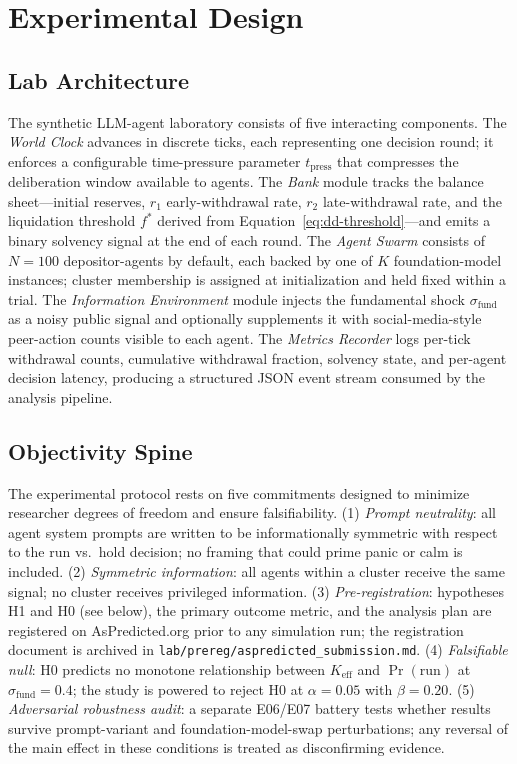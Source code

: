 \section{Experimental Design}
\label{sec:design}

\subsection{Lab Architecture}

The synthetic LLM-agent laboratory consists of five interacting components. The \emph{World Clock} advances in discrete ticks, each representing one decision round; it enforces a configurable time-pressure parameter $t_{\text{press}}$ that compresses the deliberation window available to agents. The \emph{Bank} module tracks the balance sheet---initial reserves, $r_1$ early-withdrawal rate, $r_2$ late-withdrawal rate, and the liquidation threshold $f^*$ derived from Equation~\eqref{eq:dd-threshold}---and emits a binary solvency signal at the end of each round. The \emph{Agent Swarm} consists of $N = 100$ depositor-agents by default, each backed by one of $K$ foundation-model instances; cluster membership is assigned at initialization and held fixed within a trial. The \emph{Information Environment} module injects the fundamental shock $\sigma_{\text{fund}}$ as a noisy public signal and optionally supplements it with social-media-style peer-action counts visible to each agent. The \emph{Metrics Recorder} logs per-tick withdrawal counts, cumulative withdrawal fraction, solvency state, and per-agent decision latency, producing a structured JSON event stream consumed by the analysis pipeline.

\subsection{Objectivity Spine}

The experimental protocol rests on five commitments designed to minimize researcher degrees of freedom and ensure falsifiability. (1) \emph{Prompt neutrality}: all agent system prompts are written to be informationally symmetric with respect to the run vs.\ hold decision; no framing that could prime panic or calm is included. (2) \emph{Symmetric information}: all agents within a cluster receive the same signal; no cluster receives privileged information. (3) \emph{Pre-registration}: hypotheses H1 and H0 (see below), the primary outcome metric, and the analysis plan are registered on AsPredicted.org prior to any simulation run; the registration document is archived in \texttt{lab/prereg/aspredicted\_submission.md}. (4) \emph{Falsifiable null}: H0 predicts no monotone relationship between $K_{\text{eff}}$ and $\Pr(\text{run})$ at $\sigma_{\text{fund}} = 0.4$; the study is powered to reject H0 at $\alpha = 0.05$ with $\beta = 0.20$. (5) \emph{Adversarial robustness audit}: a separate E06/E07 battery tests whether results survive prompt-variant and foundation-model-swap perturbations; any reversal of the main effect in these conditions is treated as disconfirming evidence.

